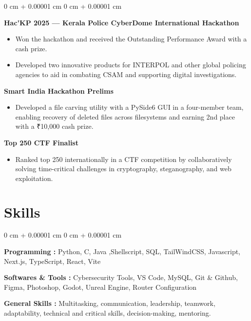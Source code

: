 \documentclass[10pt, a4paper]{article}
\newenvironment{highlights}{
    \begin{itemize}[
        topsep=0.10 cm,
        parsep=0.10 cm,
        partopsep=0pt,
        itemsep=0pt,
        leftmargin=0 cm + 10pt
    ]
}{
    \end{itemize}
} %
\newenvironment{onecolentry}{
    \begin{adjustwidth}{
        0 cm + 0.00001 cm
    }{
        0 cm + 0.00001 cm
    }
}{
    \end{adjustwidth}
} %
\begin{document}
        \begin{onecolentry}  
                \textbf{Hac'KP 2025 — Kerala Police CyberDome International Hackathon}
                \begin{highlights}
                    \item Won the hackathon and received the Outstanding Performance Award with a cash prize.
                    \item Developed two innovative products for INTERPOL and other global policing agencies to aid in combating CSAM and supporting digital investigations.
                \end{highlights}
                
                \textbf{Smart India Hackathon Prelims}
                \begin{highlights}
                    \item Developed a file carving utility with a PySide6 GUI in a four-member team, enabling recovery of deleted files across filesystems and earning 2nd place with a ₹10,000 cash prize.
                \end{highlights}

                \textbf{Top 250 CTF Finalist}
                \begin{highlights}
                    \item Ranked top 250 internationally in a CTF competition by collaboratively solving time-critical challenges in cryptography, steganography, and web exploitation.
                \end{highlights}
                
        \end{onecolentry}

    \section{Skills}

    \begin{onecolentry}
        
        \textbf{Programming :} Python, C, Java ,Shellscript, SQL, TailWindCSS, Javascript, Next.js, TypeScript, React, Vite 

        \vspace{0.05 cm}

        \textbf{Softwares \& Tools :} Cybersecurity Tools, VS Code, MySQL, Git \& Github, Figma, Photoshop,  Godot, Unreal Engine, Router Configuration

        \vspace{0.05 cm}

        \textbf{General Skills :}  Multitasking, communication, leadership, teamwork, adaptability, technical and critical skills, decision-making, mentoring.
        
    \end{onecolentry}
\end{document}
